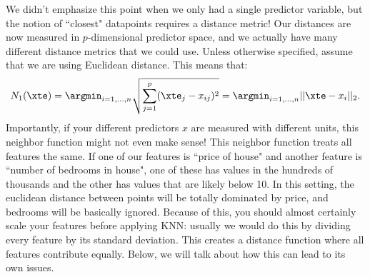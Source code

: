 We didn't emphasize this point when we only had a single predictor variable, but the notion of ``closest" datapoints requires a distance metric! Our distances are now measured in $p$-dimensional predictor space, and we actually have many different distance metrics that we could use. Unless otherwise specified, assume that we are using Euclidean distance. This means that:
$$
N_1(\xte) = \argmin_{i = 1,\ldots, n} \sqrt{ \sum_{j=1}^p (\xte_j - x_{ij})^2} = \argmin_{i = 1,\ldots, n} || \xte - x_i ||_2. 
$$
Importantly, if your different predictors $x$ are measured with different units, this neighbor function might not even make sense! This neighbor function treats all features the same. If one of our features is ``price of house" and another feature is ``number of bedrooms in house", one of these has values in the hundreds of thousands and the other has values that are likely below 10. In this setting, the euclidean distance between points will be totally dominated by price, and bedrooms will be basically ignored. Because of this, you should almost certainly scale your features before applying KNN: usually we would do this by dividing every feature by its standard deviation. This creates a distance function where all features contribute equally. Below, we will talk about how this can lead to its own issues. 

